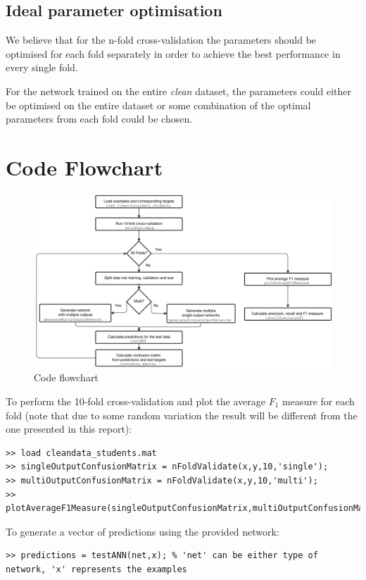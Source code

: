 \documentclass[a4paper]{article}
\begin{document}
\subsection{Ideal parameter optimisation}

We believe that for the n-fold cross-validation the parameters should be optimised for each fold separately in order to achieve the best performance in every single fold.\medskip

For the network trained on the entire \emph{clean} dataset, the parameters could either be optimised on the entire dataset or some combination of the optimal parameters from each fold could be chosen.

\clearpage


\section{Code Flowchart}

\begin{figure}[H]
\center
\includegraphics[width=1\columnwidth]{flowchart}
\caption{Code flowchart}
\label{flowchart}
\end{figure}

To perform the 10-fold cross-validation and plot the average $F_1$ measure for each fold (note that due to some random variation the result will be different from the one presented in this report):
\begin{lstlisting}
>> load cleandata_students.mat
>> singleOutputConfusionMatrix = nFoldValidate(x,y,10,'single');
>> multiOutputConfusionMatrix = nFoldValidate(x,y,10,'multi');
>> plotAverageF1Measure(singleOutputConfusionMatrix,multiOutputConfusionMatrix);
\end{lstlisting}

To generate a vector of predictions using the provided network:
\begin{lstlisting}
>> predictions = testANN(net,x); % 'net' can be either type of network, 'x' represents the examples
\end{lstlisting}

\clearpage

\end{document}
